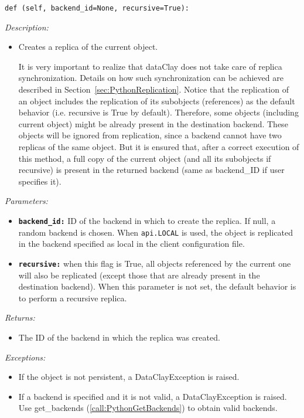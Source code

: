 \begin{dBox}
\texttt{def (self, backend\_id=None, recursive=True):}
\LINE

{\it Description:}

\begin{itemize}
    \item Creates a replica of the current object.
    
    It is very important to realize that dataClay does not take care of replica synchronization. Details on how such synchronization can be achieved are described in Section~\ref{sec:PythonReplication}.
    \newline
    \newline
    Notice that the replication of an object includes the replication of its subobjects (references) as the default behavior (i.e. recursive is True by default). Therefore, some objects (including current object) might be already present in the destination backend. These objects will be ignored from replication, since a backend cannot have two replicas of the same object. But it is ensured that, after a correct execution of this method, a full copy of the current object (and all its subobjects if recursive) is present in the returned backend (same as backend\_ID if user specifies it).

\end{itemize}

{\it Parameters:}

\begin{itemize}
    \item \texttt{\bfseries backend\_id:} ID of the backend in which to create the replica. If null, a random backend is chosen. When \texttt{api.LOCAL} is used, the object is replicated in the backend specified as local in the client configuration file.
    \item \texttt{\bfseries recursive:} when this flag is True, all objects referenced by the current one will also be replicated (except those that are already present in the destination backend). When this parameter is not set, the default behavior is to perform a recursive replica.
\end{itemize}

{\it Returns:}

\begin{itemize}
    \item The ID of the backend in which the replica was created. 
\end{itemize}

{\it Exceptions:}

\begin{itemize}
    \item If the object is not persistent, a DataClayException is raised.
    \item If a backend is specified and it is not valid, a DataClayException is raised. Use get\_backends (\ref{call:PythonGetBackends}) to obtain valid backends.
\end{itemize}

\end{dBox}


